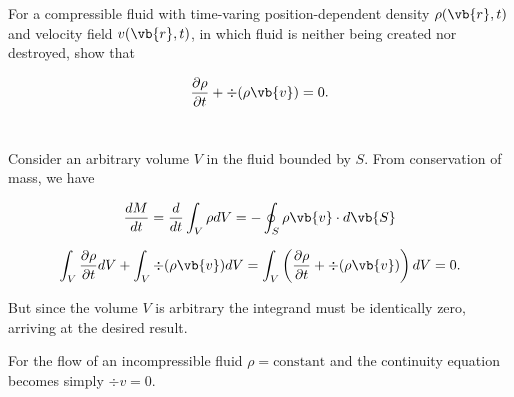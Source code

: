 \documentclass[english,a4paper,12pt]{report}
\begin{document}
{For a compressible fluid with time-varing position-dependent density \(\rho (\vb{r}, t)\) and velocity field \(v(\vb{r}, t)\), in which fluid is neither being created nor destroyed, show that 

\begin{equation}
	\frac{\partial \rho }{\partial t} + \div{(\rho \vb{v} )} = 0.
\end{equation}~
}
{Consider an arbitrary volume \(V\) in the fluid bounded by \(S\). From conservation of mass, we have

\begin{equation}
	\frac{dM}{dt} = \frac{d}{dt} \int_{V}^{} \rho dV = - \oint_{S} \rho \vb{v} \cdot d\vb{S} 
\end{equation}

\begin{equation}
	\int_{V}^{} \frac{\partial \rho }{\partial t}dV + \int_{V}^{} \div{(\rho \vb{v} )} dV = \int_{V}^{} \left( \frac{\partial \rho }{\partial t} + \div{(\rho \vb{v} )}  \right) dV = 0.    
\end{equation}

But since the volume \(V\) is arbitrary the integrand must be identically zero, arriving at the desired result.

For the flow of an incompressible fluid \(\rho = \text{constant} \) and the continuity equation becomes simply \(\div{v} = 0\).~
}
\end{document}
